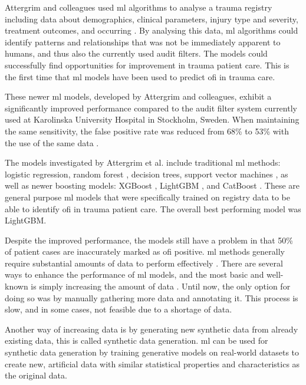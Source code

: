 \documentclass[12pt, a4paper]{article}
\begin{document}
Attergrim and colleagues used \acrshort{ml} algorithms to analyse a trauma registry including data about demographics,
clinical parameters, injury type and severity, treatment outcomes, and occurring . By analysing this
data, \acrshort{ml} algorithms could identify patterns and relationships that was not be immediately apparent to
humans, and thus also the currently used audit filters. The models could successfully find opportunities for
improvement in trauma patient care. This is the first time that \acrshort{ml} models have been used to predict
\acrshort{ofi} in trauma care. \cite{attergrim_predicting_2023}

These newer \acrshort{ml} models, developed by Attergrim and colleagues, exhibit a significantly improved performance
compared to the audit filter system currently used at Karolinska University Hospital in Stockholm, Sweden. When
maintaining the same sensitivity, the false positive rate was reduced from 68\% to 53\% with the use of the same data
\cite{attergrim_predicting_2023}.

The models investigated by Attergrim et al. \cite{attergrim_predicting_2023} include traditional \acrshort{ml} methods:
logistic regression, random forest \cite{breiman_random_2001}, decision trees, support vector machines
\cite{cortes_support-vector_1995}, as well as newer boosting models: XGBoost \cite{chen_xgboost_2016}, LightGBM
\cite{ke_lightgbm_2017}, and CatBoost \cite{prokhorenkova_catboost_2018}. These are general purpose \acrshort{ml}
models that were specifically trained on registry data to be able to identify \acrshort{ofi} in trauma patient care.
The overall best performing model was LightGBM.

Despite the improved performance, the models still have a problem in that 50\% of patient cases are inaccurately marked
as \acrshort{ofi} positive. \acrshort{ml} methods generally require substantial amounts of data to perform effectively
\cite{piccialli_survey_2021}. There are several ways to enhance the performance of \acrshort{ml} models, and the most
basic and well-known is simply increasing the amount of data \cite{greener_guide_2022}. Until now, the only option for
doing so was by manually gathering more data and annotating it. This process is slow, and in some cases, not feasible
due to a shortage of data.

Another way of increasing data is by generating new synthetic data from already existing data, this is called synthetic
data generation. \acrshort{ml} can be used for synthetic data generation by training generative models on real-world
datasets to create new, artificial data with similar statistical properties and characteristics as the original data.
\cite{chen_synthetic_2021}
\end{document}
